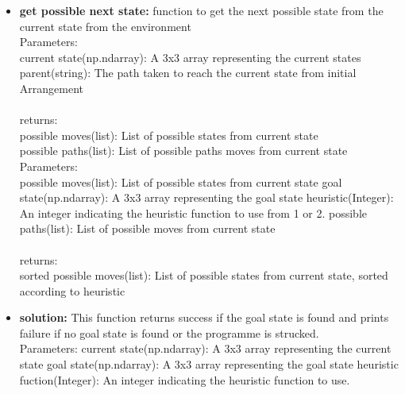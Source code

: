 \documentclass[conference]{IEEEtran}
\begin{document}
\begin{itemize}
\\
     \item \textbf{get possible next state:}
function to get the next possible state from the current state from the environment
\\
Parameters:
\\
current state(np.ndarray): A 3x3 array representing the current states
parent(string): The path taken to reach the current state
from initial Arrangement
\\
\\
returns:
\\
possible moves(list): List of possible states from current state
\\
possible paths(list): List of possible paths moves from current state
\\

Parameters:
\\
possible moves(list): List of possible states from current state
goal state(np.ndarray): A 3x3  array representing the goal state
heuristic(Integer): An integer indicating the heuristic
function to use from 1 or 2.
possible paths(list): List of possible moves from current state
\\
\\
returns:
\\
sorted possible moves(list): List of possible states from current state, sorted according to heuristic
\\
      \item \textbf{solution:}
This function returns success if the goal state is found and prints failure if no goal state is found or the programme is strucked.
\\
Parameters:
current state(np.ndarray): A 3x3 array representing the current state
goal state(np.ndarray): A 3x3 array representing the goal state
heuristic fuction(Integer): An integer indicating the heuristic
function to use.
\\
\\
\end{itemize}
\end{document}
